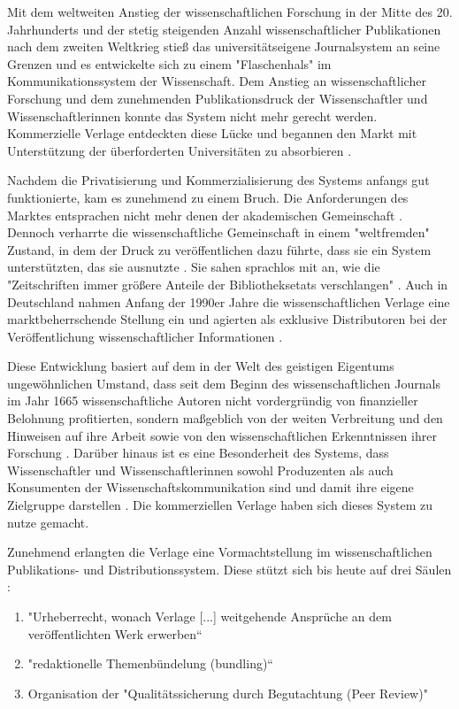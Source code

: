Mit dem weltweiten Anstieg der wissenschaftlichen Forschung in der Mitte des 20. Jahrhunderts und der stetig steigenden Anzahl wissenschaftlicher Publikationen nach dem zweiten Weltkrieg stieß das universitätseigene Journalsystem an seine Grenzen und es entwickelte sich zu einem "Flaschenhals" \cite{epaa_Weiner_2001} im Kommunikationssystem der Wissenschaft. Dem Anstieg an wissenschaftlicher Forschung und dem zunehmenden Publikationsdruck der Wissenschaftler und Wissenschaftlerinnen konnte das System nicht mehr gerecht werden. Kommerzielle Verlage entdeckten diese Lücke und begannen den Markt mit Unterstützung der überforderten Universitäten zu absorbieren \cite{Hirschi_2015_buch_oa}.

Nachdem die Privatisierung und Kommerzialisierung des Systems anfangs gut funktionierte, kam es zunehmend zu einem Bruch. Die Anforderungen des Marktes entsprachen nicht mehr denen der akademischen Gemeinschaft \cite{epaa_Weiner_2001}. Dennoch verharrte die wissenschaftliche Gemeinschaft in einem "weltfremden" Zustand, in dem der Druck zu veröffentlichen dazu führte, dass sie ein System unterstützten, das sie ausnutzte \cite{epaa_Weiner_2001}. Sie sahen sprachlos mit an, wie die "Zeitschriften immer größere Anteile der Bibliotheksetats verschlangen" \cite{hagner_2015_sache_buches}. Auch in Deutschland nahmen Anfang der 1990er Jahre die wissenschaftlichen Verlage eine marktbeherrschende Stellung ein und agierten als exklusive Distributoren bei der Veröffentlichung wissenschaftlicher Informationen \cite{schloegl_2005} \cite{offhaus_2012_institutionelle_repos}.

Diese Entwicklung basiert auf dem in der Welt des geistigen Eigentums ungewöhnlichen Umstand, dass seit dem Beginn des wissenschaftlichen Journals im Jahr 1665 wissenschaftliche Autoren nicht vordergründig von finanzieller Belohnung profitierten, sondern maßgeblich von der weiten Verbreitung und den Hinweisen auf ihre Arbeit sowie von den wissenschaftlichen Erkenntnissen ihrer Forschung \cite{albert_2006_open_implications}. Darüber hinaus ist es eine Besonderheit des Systems, dass Wissenschaftler und Wissenschaftlerinnen sowohl Produzenten als auch Konsumenten der Wissenschaftskommunikation sind und damit ihre eigene Zielgruppe darstellen \cite{Hess_2006}. Die kommerziellen Verlage haben sich dieses System zu nutze gemacht.

Zunehmend erlangten die Verlage eine Vormachtstellung im wissenschaftlichen Publikations- und Distributionssystem. Diese stützt sich bis heute auf drei Säulen \cite{offhaus_2012_institutionelle_repos} \cite{bargheer_2006_open}:
\begin{enumerate}
\item "Urheberrecht, wonach Verlage [...] weitgehende Ansprüche an dem veröffentlichten Werk erwerben“
\item "redaktionelle Themenbündelung (bundling)“
\item Organisation der "Qualitätssicherung durch Begutachtung (Peer Review)"
\end{enumerate}

